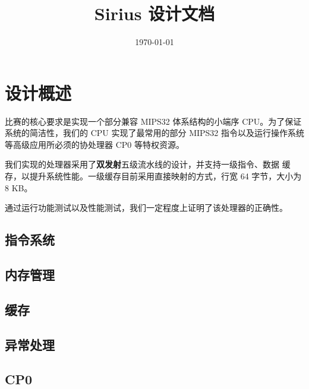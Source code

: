 \documentclass[blue,normal,cn]{elegantbook}
\title{Sirius 设计文档}
\date{\today}
\begin{document}
\tableofcontents
\mainmatter

\chapter{设计概述}

比赛的核心要求是实现一个部分兼容 MIPS32 体系结构的小端序 CPU。为了保证
系统的简洁性，我们的 CPU 实现了最常用的部分 MIPS32 指令以及运行操作系统
等高级应用所必须的协处理器 CP0 等特权资源。

我们实现的处理器采用了\textbf{双发射}五级流水线的设计，并支持一级指令、数据
缓存，以提升系统性能。一级缓存目前采用直接映射的方式，行宽 64 字节，大小为 8 KB。

通过运行功能测试以及性能测试，我们一定程度上证明了该处理器的正确性。

\section{指令系统}

\section{内存管理}

\section{缓存}

\section{异常处理}

\section{CP0}
\end{document}
